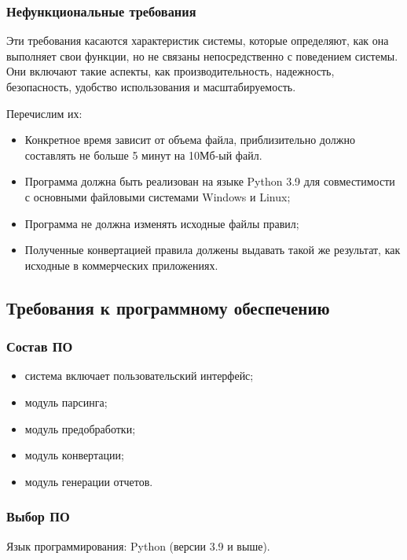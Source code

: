 \subsubsection{Нефункциональные требования}

Эти требования касаются характеристик системы, которые определяют,
как она выполняет свои функции,
но не связаны непосредственно с поведением системы.
Они включают такие аспекты, как производительность, надежность, безопасность,
удобство использования и масштабируемость.

Перечислим их:

\begin{itemize}
	\item Конкретное время зависит от объема файла,
		приблизительно должно составлять не больше 5 минут на 10Мб-ый файл.
    \item Программа должна быть реализован на языке Python 3.9
		для совместимости с основными файловыми системами Windows и Linux;
    \item Программа не должна изменять исходные файлы правил;
    \item Полученные конвертацией правила должены выдавать
		такой же результат, как исходные в коммерческих приложениях.
\end{itemize}

\subsection{Требования к программному обеспечению}

\subsubsection{Состав ПО}

\begin{itemize}
	\item система включает пользовательский интерфейс;
	\item модуль парсинга;
	\item модуль предобработки;
	\item модуль конвертации;
	\item модуль генерации отчетов.
\end{itemize}

\subsubsection{Выбор ПО}

Язык программирования: Python (версии 3.9 и выше).

